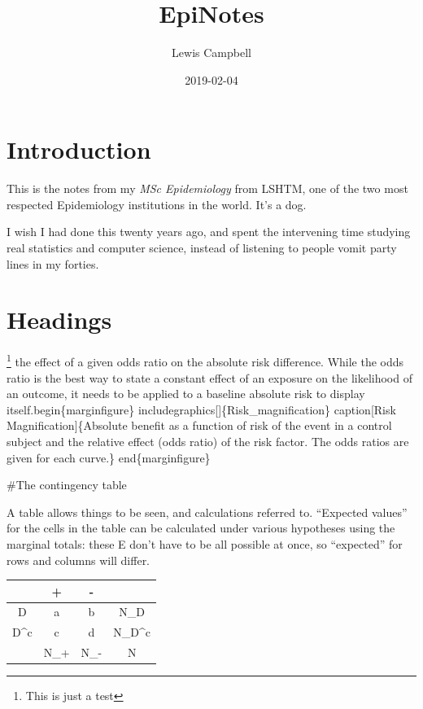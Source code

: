 \documentclass[]{tufte-handout}
\title{EpiNotes}
\author{Lewis Campbell}
\date{2019-02-04}
\begin{document}
\maketitle




\hypertarget{introduction}{%
\section{Introduction}\label{introduction}}

This is the notes from my \textit{MSc Epidemiology} from LSHTM, one of
the two most respected Epidemiology institutions in the world. It's a
dog.

I wish I had done this twenty years ago, and spent the intervening time
studying real statistics and computer science, instead of listening to
people vomit party lines in my forties.

\hypertarget{headings}{%
\section{Headings}\label{headings}}

\footnote{This is
  just a test} the effect of a given odds ratio on the absolute risk
difference. While the odds ratio is the best way to state a constant
effect of an exposure on the likelihood of an outcome, it needs to be
applied to a baseline absolute risk to display
itself.begin\{marginfigure\}
includegraphics{[}{]}\{Risk\_magnification\} caption{[}Risk
Magnification{]}\{Absolute benefit as a function of risk of the event in
a control subject and the relative effect (odds ratio) of the risk
factor. The odds ratios are given for each curve.\} end\{marginfigure\}

\#The contingency table

A table allows things to be seen, and calculations referred to.
``Expected values'' for the cells in the table can be calculated under
various hypotheses using the marginal totals: these E don't have to be
all possible at once, so ``expected'' for rows and columns will differ.

\begin{tabular}{| c |c | c | c| }
\caption{Contingency Table}
\hline
& + & - & \\ \hline
D & a & b & N_{D} \\ \hline
D^c & c & d & N_{D^c} \\ \hline
& N_{+} &  N_{-}  & N \\
\hline
\end{tabular}
\end{document}
